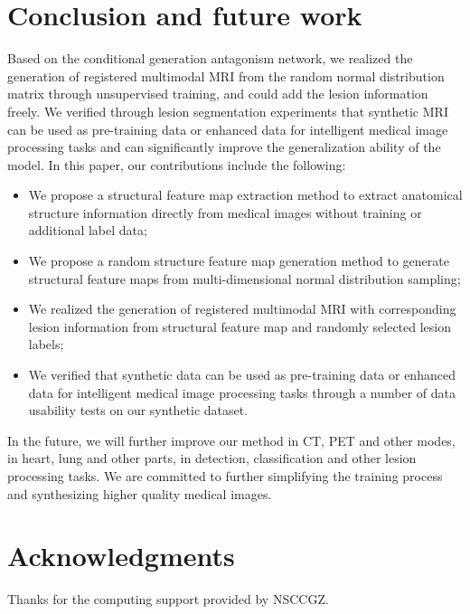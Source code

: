 \documentclass[letterpaper]{article} %
\begin{document}
\section{Conclusion and future work}
Based on the conditional generation antagonism network, we realized the generation of registered multimodal MRI from the random normal distribution matrix through unsupervised training, and could add the lesion information freely. 
We verified through lesion segmentation experiments that synthetic MRI can be used as pre-training data or enhanced data for intelligent medical image processing tasks and can significantly improve the generalization ability of the model.
In this paper, our contributions include the following:
\begin{itemize}
	\item We propose a structural feature map extraction method to extract anatomical structure information directly from medical images without training or additional label data;
	\item We propose a random structure feature map generation method to generate structural feature maps from multi-dimensional normal distribution sampling;
	\item We realized the generation of registered multimodal MRI with corresponding lesion information from structural feature map and randomly selected lesion labels;
	\item We verified that synthetic data can be used as pre-training data or enhanced data for intelligent medical image processing tasks through a number of data usability tests on our synthetic dataset.
	
\end{itemize}

In the future, we will further improve our method in CT, PET and other modes, in heart, lung and other parts, in detection, classification and other lesion processing tasks. We are committed to further simplifying the training process and synthesizing higher quality medical images.	

\section{ Acknowledgments}

Thanks for the computing support provided by NSCCGZ.




\end{document}
